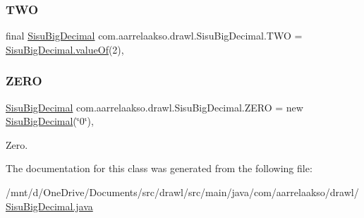 \subsubsection{\texorpdfstring{T\+WO}{TWO}}
{\footnotesize\ttfamily final \hyperlink{classcom_1_1aarrelaakso_1_1drawl_1_1_sisu_big_decimal}{Sisu\+Big\+Decimal} com.\+aarrelaakso.\+drawl.\+Sisu\+Big\+Decimal.\+T\+WO = \hyperlink{classcom_1_1aarrelaakso_1_1drawl_1_1_sisu_big_decimal_a076ac8cd04ac04e39f7f3fcc7ce9a4a1}{Sisu\+Big\+Decimal.\+value\+Of}(2)\hspace{0.3cm}{\ttfamily [static]}, {\ttfamily [protected]}}

\mbox{\label{classcom_1_1aarrelaakso_1_1drawl_1_1_sisu_big_decimal_a5722f4f25f56502bda610b56ec3857be}} 
\subsubsection{\texorpdfstring{Z\+E\+RO}{ZERO}}
{\footnotesize\ttfamily \hyperlink{classcom_1_1aarrelaakso_1_1drawl_1_1_sisu_big_decimal}{Sisu\+Big\+Decimal} com.\+aarrelaakso.\+drawl.\+Sisu\+Big\+Decimal.\+Z\+E\+RO = new \hyperlink{classcom_1_1aarrelaakso_1_1drawl_1_1_sisu_big_decimal}{Sisu\+Big\+Decimal}(\char`\"{}0\char`\"{})\hspace{0.3cm}{\ttfamily [static]}, {\ttfamily [protected]}}



Zero. 



The documentation for this class was generated from the following file\+:\begin{DoxyCompactItemize}
\item 
/mnt/d/\+One\+Drive/\+Documents/src/drawl/src/main/java/com/aarrelaakso/drawl/\hyperlink{_sisu_big_decimal_8java}{Sisu\+Big\+Decimal.\+java}\end{DoxyCompactItemize}
